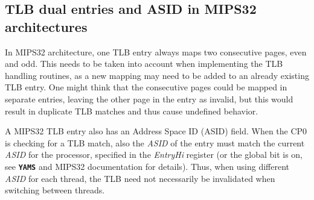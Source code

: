 \documentclass[twoside,a4paper]{report}
\newcommand{\yams}{\texttt{\textbf{YAMS}}}
\begin{document}
\subsection{TLB dual entries and ASID in MIPS32 architectures}
\label{sec:tlbmips}

In MIPS32 architecture, one TLB entry always maps two consecutive pages,
even and odd. This needs to be taken into account when implementing
the TLB handling routines, as a new mapping may need to be added to an
already existing TLB entry. One might think that the consecutive pages
could be mapped in separate entries, leaving the other page in the
entry as invalid, but this would result in duplicate TLB matches and
thus cause undefined behavior.

A MIPS32 TLB entry also has an Address Space ID (ASID) 
 field. When the CP0 is checking for a
TLB match, also the \emph{ASID} of the entry must match the current
\emph{ASID} for the processor, specified in the \emph{EntryHi}
register (or the global bit is on, see \yams{} and MIPS32 documentation
for details). Thus, when using different \emph{ASID} for each thread,
the TLB need not necessarily be invalidated when switching between
threads.
\end{document}
